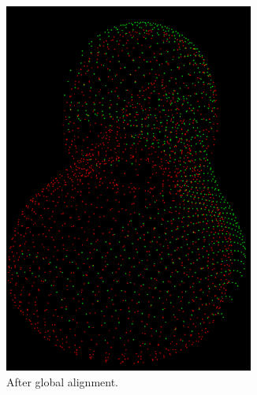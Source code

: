 \documentclass[../main.tex]{subfiles}
\begin{document}
\begin{figure}[H]
\begin{subfigure}[t]{0.2\textwidth}
        \includegraphics[width=0.9\textwidth]{figures/simulated_depth_sensor/after_global_alignment.png}
        \caption{After global alignment.}
        \label{subfig:sds_after_global}
    \end{subfigure}
    \begin{subfigure}[t]{0.2\textwidth}
        \centering
        \captionsetup{width=.9\textwidth}

\end{subfigure}
\end{figure}
\end{document}

